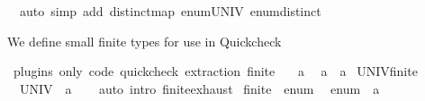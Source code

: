 \begin{isabellebody}
\ \ auto\ simp\ add{\isacharcolon}{\kern0pt}\ distinct{\isacharunderscore}{\kern0pt}map\ enum{\isacharunderscore}{\kern0pt}UNIV\ enum{\isacharunderscore}{\kern0pt}distinct{\isacharparenright}{\kern0pt}%
\endisatagproof
{\isafoldproof}%
%
\isadelimproof
%
\endisadelimproof
\isanewline
\isanewline
{}\isamarkupfalse%
%
\isadelimdocument
%
\endisadelimdocument
%
\isatagdocument
%
\isamarkuptrue%
%
\endisatagdocument
{\isafolddocument}%
%
\isadelimdocument
%
\endisadelimdocument
%
\begin{isamarkuptext}%
We define small finite types for use in Quickcheck%
\end{isamarkuptext}\isamarkuptrue%
\isamarkupfalse%
\ {\isacharparenleft}{\kern0pt}plugins\ only{\isacharcolon}{\kern0pt}\ code\ {\isachardoublequoteopen}quickcheck{\isachardoublequoteclose}\ extraction{\isacharparenright}{\kern0pt}\ finite{\isacharunderscore}{\kern0pt}{}\ {\isacharequal}{\kern0pt}\isanewline
\ \ a\isanewline
\isanewline
{}\isamarkupfalse%
\ {\isacharparenleft}{\kern0pt}\ a\ \ {\isacharparenleft}{\kern0pt}{\isachardoublequoteopen}a\isanewline
\isanewline
{}\isamarkupfalse%
\ UNIV{\isacharunderscore}{\kern0pt}finite{\isacharunderscore}{\kern0pt}{}{\isacharcolon}{\kern0pt}\isanewline
\ \ {\isachardoublequoteopen}UNIV\ {\isacharequal}{\kern0pt}\ {\isacharbraceleft}{\kern0pt}a\isanewline
%
\isadelimproof
\ \ %
\endisadelimproof
%
\isatagproof
{}\isamarkupfalse%
\ {\isacharparenleft}{\kern0pt}auto\ intro{\isacharcolon}{\kern0pt}\ finite{\isacharunderscore}{\kern0pt}{}{\isachardot}{\kern0pt}exhaust{\isacharparenright}{\kern0pt}%
\endisatagproof
{\isafoldproof}%
%
\isadelimproof
\isanewline
%
\endisadelimproof
\isanewline
{}\isamarkupfalse%
\ finite{\isacharunderscore}{\kern0pt}{}\ {\isacharcolon}{\kern0pt}{\isacharcolon}{\kern0pt}\ enum\isanewline
{}\isanewline
\isanewline
{}\isamarkupfalse%
\isanewline
\ \ {\isachardoublequoteopen}enum\ {\isacharequal}{\kern0pt}\ {\isacharbrackleft}{\kern0pt}a\isanewline
\isanewline
{}\isamarkupfalse%

\end{isabellebody}
